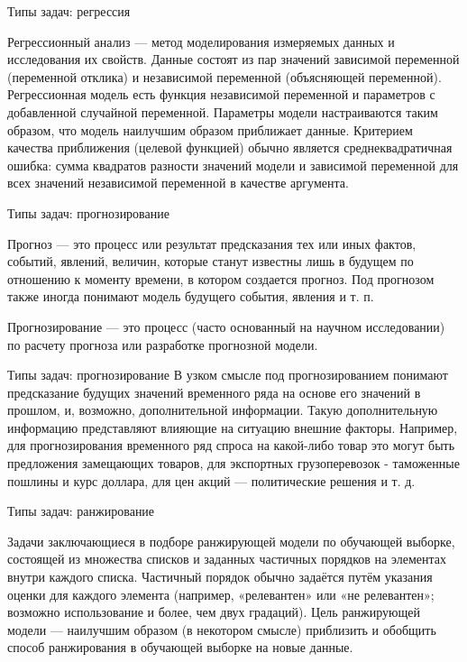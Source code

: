 \documentclass{beamer}
\begin{document}
\begin{frame}{Типы задач:  регрессия}

Регрессионный анализ — метод моделирования измеряемых данных и исследования их свойств. 
Данные состоят из пар значений зависимой переменной (переменной отклика) и независимой 
переменной (объясняющей переменной). 
Регрессионная модель есть функция независимой переменной и параметров с добавленной случайной переменной. 
Параметры модели настраиваются таким образом, что модель наилучшим образом приближает данные.
Критерием качества приближения (целевой функцией) обычно является среднеквадратичная ошибка: сумма квадратов разности значений модели и зависимой переменной для всех значений независимой переменной в качестве аргумента. 
 
\end{frame}




\begin{frame}{Типы задач: прогнозирование}

Прогноз — это процесс или результат предсказания тех или иных фактов, событий, 
явлений, величин, которые станут известны лишь в будущем по 
отношению к моменту времени, в котором создается прогноз. Под прогнозом также иногда понимают 
модель будущего события, явления и т. п.

Прогнозирование — это процесс (часто основанный на научном исследовании) по расчету 
прогноза или разработке прогнозной модели.


\end{frame}

\begin{frame}{Типы задач: прогнозирование}
В узком смысле под прогнозированием понимают предсказание будущих значений временного 
ряда на основе его значений в прошлом, и, возможно, дополнительной информации. 
Такую дополнительную информацию представляют влияющие на ситуацию внешние факторы. 
Например, для прогнозирования временного ряд спроса на какой-либо товар 
это могут быть предложения замещающих товаров, для экспортных грузоперевозок - 
таможенные пошлины и курс доллара, для цен акций — политические решения и т. д. 


\end{frame}


\begin{frame}{Типы задач: ранжирование}

Задачи заключающиеся в подборе ранжирующей модели по обучающей выборке, 
состоящей из множества списков и заданных частичных порядков на элементах
 внутри каждого списка. Частичный порядок обычно задаётся путём указания оценки для каждого элемента 
 (например, «релевантен» или «не релевантен»; возможно использование и более, чем двух градаций). 
 Цель ранжирующей модели — наилучшим образом (в некотором смысле) приблизить и обобщить способ
  ранжирования в обучающей выборке на новые данные.

\end{frame}
\end{document}
